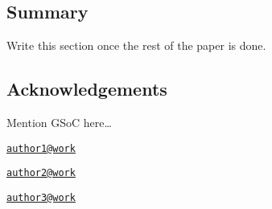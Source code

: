 \subsection{Summary}\label{summary}

Write this section once the rest of the paper is done.



\subsection{Acknowledgements}\label{acknowledgements}

Mention GSoC here\ldots{}

\address{%
Author One\\
Affiliation\\
line 1\\ line 2\\
}
\href{mailto:author1@work}{\nolinkurl{author1@work}}

\address{%
Author Two\\
Affiliation\\
line 1\\ line 2\\
}
\href{mailto:author2@work}{\nolinkurl{author2@work}}

\address{%
Author Three\\
Affiliation\\
line 1\\ line 2\\
}
\href{mailto:author3@work}{\nolinkurl{author3@work}}

